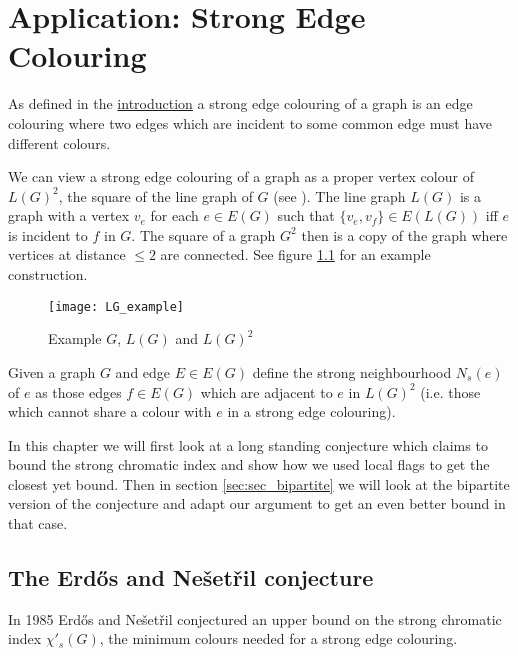 \chapter{Application: Strong Edge Colouring}
\label{chap:strong_edge_colouring}

As defined in the \hyperref[sec:intro_strong_edge_coloring]{introduction}
a strong edge colouring of a graph is an edge colouring where two edges which are incident to some
common edge must have different colours.

We can view a strong edge colouring of a graph as a proper vertex colour of $L(G)^2$, the
square of the line graph of $G$ (see \cite{molloyBoundStrongChromatic1997}).
The line graph $L(G)$ is a graph with a vertex $v_e$ for
each $e\in E(G)$ such that $\{v_e, v_f\} \in E(L(G))$ iff $e$ is incident to $f$ in
$G$. The square of a graph $G^2$ then is a copy of the graph where vertices at distance $\leq 2$
are connected. See figure \ref{fig:lg_example} for an example construction.

\begin{figure}[ht]
    \centering
    \texttt{[image: LG\_example]}
    \caption{Example $G$, $L(G)$ and $L(G)^2$}
    \label{fig:lg_example}
\end{figure}

\begin{definition}
    Given a graph $G$ and edge $E \in E(G)$ define the strong neighbourhood
    $N_s(e)$ of $e$ as those edges $f \in E(G)$ which are adjacent to $e$ in 
    $L(G)^2$ (i.e. those which cannot share a colour with $e$ in a strong edge colouring).
\end{definition}

In this chapter we will first look at a long standing conjecture which claims to bound
the strong chromatic index and show how we used local flags to get the closest yet bound.
Then in section \ref{sec:sec_bipartite} we will look at the bipartite version of the
conjecture and adapt our argument to get an even better bound in that case.

\section{The Erd\H{o}s and Nešetřil conjecture}

In 1985 Erd\H{o}s and Nešetřil \cite{faudreeInducedMatchingsBipartite1989} conjectured an
upper bound on the strong chromatic index $\chi'_s(G)$, the minimum colours needed for
a strong edge colouring.

